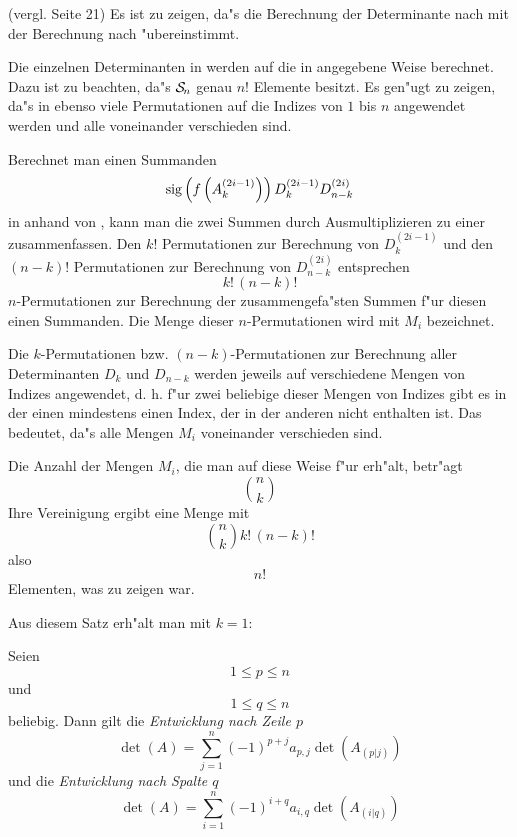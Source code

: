 \begin{beweis}
    (vergl. \cite{Csan74} Seite 21)
    Es ist zu zeigen, da"s die Berechnung der Determinante nach
     mit der Berechnung nach 
    "ubereinstimmt.

    Die einzelnen Determinanten in  werden auf
    die in  angegebene Weise berechnet.
    Dazu ist zu beachten, da"s $\cal S \mit \!_n$ genau $n!$
    Elemente besitzt.
    Es gen"ugt zu zeigen, da"s in 
    ebenso viele Permutationen auf die Indizes von $1$ bis $n$ angewendet
    werden und alle voneinander verschieden sind.

    Berechnet man einen Summanden
    \[ \mbox{\rm sig}\left( f\left( A_k^{(2i-1)}\right)\right) D_k^{(2i-1)} D_{n-k}^{(2i)} \]
    in  anhand von ,
    kann man die zwei Summen durch Ausmultiplizieren zu einer
    zusammenfassen. Den $k!$ Permutationen zur Berechnung von $D_k^{(2i-1)}$
    und den $(n-k)!$ Permutationen zur Berechnung von $D_{n-k}^{(2i)}$
    entsprechen \[ k! \, (n-k)! \] $n$-Permutationen zur Berechnung der
    zusammengefa"sten Summen f"ur diesen einen Summanden. Die Menge dieser
    $n$-Permutationen wird mit $M_i$ bezeichnet.

    Die $k$-Permutationen bzw. $(n-k)$-Permutationen zur Berechnung aller
    Determinanten $D_k$ und $D_{n-k}$ werden jeweils auf
    verschiedene Mengen von Indizes angewendet, d. h. f"ur zwei beliebige
    dieser Mengen von Indizes gibt es in der einen mindestens einen Index,
    der in der anderen nicht enthalten ist. Das bedeutet, da"s alle Mengen
    $M_i$ voneinander verschieden sind.

    Die Anzahl der Mengen $M_i$, die man auf diese Weise f"ur
     erh"alt, betr"agt \[ {n \choose k} \]
    Ihre Vereinigung ergibt eine Menge mit 
    \[ {n \choose k} k! \, (n-k)! \]
    also \[ n! \] Elementen, was zu zeigen war.
\end{beweis}

Aus diesem Satz erh"alt man mit $k=1$:

\begin{korollar}
\label{SatzEntw}
     Seien \[ 1 \leq p \leq n \] und \[ 1 \leq q \leq n \] beliebig.
     Dann gilt die {\em Entwicklung nach Zeile $p$}
     \[ \det(A)= \sum_{j=1}^n (-1)^{p+j} a_{p,j} \det(A_{(p|j)}) \]
     und die {\em Entwicklung nach Spalte $q$}
     \[ \det(A)= \sum_{i=1}^n (-1)^{i+q} a_{i,q} \det(A_{(i|q)}) \]
\end{korollar}

